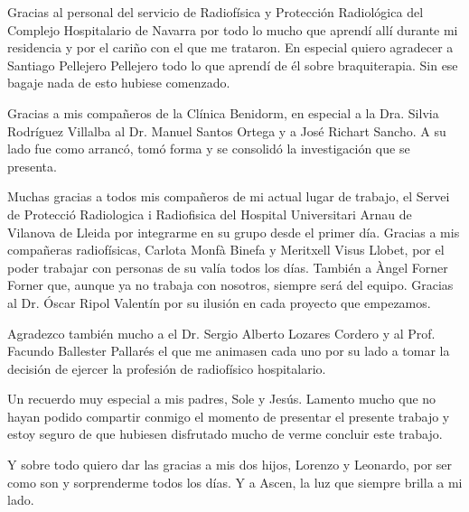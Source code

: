 \documentclass[
  a4paper,
]{scrreprt}
\renewcommand*\contentsname{Tabla de contenidos}
\newcommand\contentsname{Tabla de contenidos}
\begin{document}
Gracias al personal del servicio de Radiofísica y Protección Radiológica del Complejo Hospitalario de Navarra por todo lo mucho que aprendí allí durante mi residencia y por el cariño con el que me trataron. En especial quiero agradecer a Santiago Pellejero Pellejero todo lo que aprendí de él sobre braquiterapia. Sin ese bagaje nada de esto hubiese comenzado.

Gracias a mis compañeros de la Clínica Benidorm, en especial a la Dra. Silvia Rodríguez Villalba al Dr. Manuel Santos Ortega y a José Richart Sancho. A su lado fue como arrancó, tomó forma y se consolidó la investigación que se presenta.

Muchas gracias a todos mis compañeros de mi actual lugar de trabajo, el Servei de Protecció Radiologica i Radiofisica del Hospital Universitari Arnau de Vilanova de Lleida por integrarme en su grupo desde el primer día. Gracias a mis compañeras radiofísicas, Carlota Monfà Binefa y Meritxell Visus Llobet, por el poder trabajar con personas de su valía todos los días. También a Àngel Forner Forner que, aunque ya no trabaja con nosotros, siempre será del equipo. Gracias al Dr. Óscar Ripol Valentín por su ilusión en cada proyecto que empezamos.

Agradezco también mucho a el Dr. Sergio Alberto Lozares Cordero y al Prof. Facundo Ballester Pallarés el que me animasen cada uno por su lado a tomar la decisión de ejercer la profesión de radiofísico hospitalario.

Un recuerdo muy especial a mis padres, Sole y Jesús. Lamento mucho que no hayan podido compartir conmigo el momento de presentar el presente trabajo y estoy seguro de que hubiesen disfrutado mucho de verme concluir este trabajo.

Y sobre todo quiero dar las gracias a mis dos hijos, Lorenzo y Leonardo, por ser como son y sorprenderme todos los días. Y a Ascen, la luz que siempre brilla a mi lado.

\newpage
\thispagestyle{empty}
\begin{flushright}
\end{flushright}\ifdefined\Shaded\renewenvironment{Shaded}{\begin{tcolorbox}[frame hidden, boxrule=0pt, breakable, interior hidden, enhanced, borderline west={3pt}{0pt}{shadecolor}, sharp corners]}{\end{tcolorbox}}\fi

\renewcommand*\contentsname{Tabla de contenidos}
{
\hypersetup{linkcolor=}
\setcounter{tocdepth}{2}
\tableofcontents
}
\listoffigures
\listoftables
{}
\end{document}
